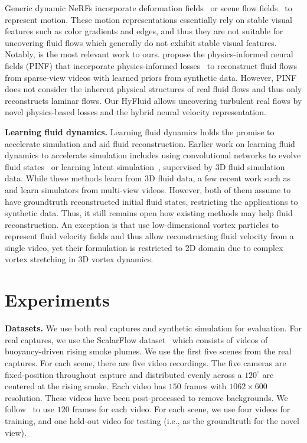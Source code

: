 \documentclass{article}
\newcommand{\model}{HyFluid\xspace}
\newcommand{\myparagraph}[1]{\vspace{0.1cm}\noindent\textbf{#1}}
\begin{document}
Generic dynamic NeRFs incorporate deformation fields~\citep{park2021hypernerf,pumarola2021d,park2021nerfies} or scene flow fields~\citep{li2021neural,du2021neural,xian2021space,li2022neural} to represent motion. These motion representations essentially rely on stable visual features such as color gradients and edges, and thus they are not suitable for uncovering fluid flows which generally do not exhibit stable visual features. Notably, \citep{chu2022physics} is the most relevant work to ours. \citet{chu2022physics} propose the physics-informed neural fields (PINF) that incorporate physics-informed losses~\citep{raissi2019physics} to reconstruct fluid flows from sparse-view videos with learned priors from synthetic data. However, PINF does not consider the inherent physical structures of real fluid flows and thus only reconstructs laminar flows. Our \model allows uncovering turbulent real flows by novel physics-based losses and the hybrid neural velocity representation.

\myparagraph{Learning fluid dynamics.}
Learning fluid dynamics holds the promise to accelerate simulation and aid fluid reconstruction. Earlier work on learning fluid dynamics to accelerate simulation includes using convolutional networks to evolve fluid states~\citep{tompson2017accelerating,ummenhofer2019lagrangian,prantl2022guaranteed} or learning latent simulation~\citep{wiewel2019latent,kim2019deep}, supervised by 3D fluid simulation data.
While these methods learn from 3D fluid data, a few recent work such as \citet{guan2022neurofluid} and \citet{liu2023inferring} learn simulators from multi-view videos. 
However, both of them assume to have groundtruth reconstructed initial fluid states, restricting the applications to synthetic data. Thus, it still remains open how existing methods may help fluid reconstruction. An exception is \citet{deng2023learning} that use low-dimensional vortex particles to represent fluid velocity fields and thus allow reconstructing fluid velocity from a single video, yet their formulation is restricted to 2D domain due to complex vortex stretching in 3D vortex dynamics. \section{Experiments}

\myparagraph{Datasets.} We use both real captures and synthetic simulation for evaluation. For real captures, we use the ScalarFlow dataset~\citep{eckert2019scalarflow} which consists of videos of buoyancy-driven rising smoke plumes. We use the first five scenes from the real captures. For each scene, there are five video recordings. The five cameras are fixed-position throughout capture and distributed evenly across a $120^{\circ}$ arc centered at the rising smoke. Each video has $150$ frames with $1062\times 600$ resolution. These videos have been post-processed to remove backgrounds. We follow~\citet{chu2022physics} to use $120$ frames for each video. For each scene, we use four videos for training, and one held-out video for testing (i.e., as the groundtruth for the novel view). 
\end{document}
